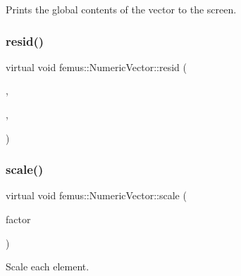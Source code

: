 Prints the global contents of the vector to the screen. \mbox{\label{classfemus_1_1_numeric_vector_a421d6425fa15f0addb36804fc230ca90}} 
\subsubsection{\texorpdfstring{resid()}{resid()}}
{\footnotesize\ttfamily virtual void femus\+::\+Numeric\+Vector\+::resid (\begin{DoxyParamCaption}\item[{const \mbox{\hyperlink{classfemus_1_1_numeric_vector}{Numeric\+Vector}} \&}]{,  }\item[{const \mbox{\hyperlink{classfemus_1_1_numeric_vector}{Numeric\+Vector}} \&}]{,  }\item[{const \mbox{\hyperlink{classfemus_1_1_sparse_matrix}{Sparse\+Matrix}} \&}]{ }\end{DoxyParamCaption})\hspace{0.3cm}{\ttfamily [pure virtual]}}

\mbox{\label{classfemus_1_1_numeric_vector_a69a852e1b8b362836c707941bcab6f10}} 
\subsubsection{\texorpdfstring{scale()}{scale()}}
{\footnotesize\ttfamily virtual void femus\+::\+Numeric\+Vector\+::scale (\begin{DoxyParamCaption}\item[{const double}]{factor }\end{DoxyParamCaption})\hspace{0.3cm}{\ttfamily [pure virtual]}}



Scale each element. 

\mbox{\label{classfemus_1_1_numeric_vector_ae76dc72630fe1516241d7f02438e6c19}} 
